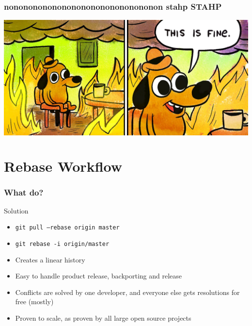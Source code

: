 \documentclass{beamer}
\begin{document}
\begin{frame}
\frametitle{nonononononononononononononononon stahp STAHP}
    \begin{center}
        \includegraphics[scale=1.4]{pictures/thisisfine.jpg}    
    \end{center}
\end{frame}



\section{Rebase Workflow}
\begin{frame}
\frametitle{What do?}
\begin{block}{Solution}
    \begin{itemize}
        \item \texttt{git pull --rebase origin master}
        \item \texttt{git rebase -i origin/master}  
    \end{itemize}
\end{block}

\pause \begin{itemize}
    \item Creates a linear history
    \item Easy to handle product release, backporting and release
    \item Conflicts are solved by one developer, and everyone else gets resolutions for free (mostly)
    \item Proven to scale, as proven by all large open source projects
\end{itemize}
\end{frame}
\end{document}

